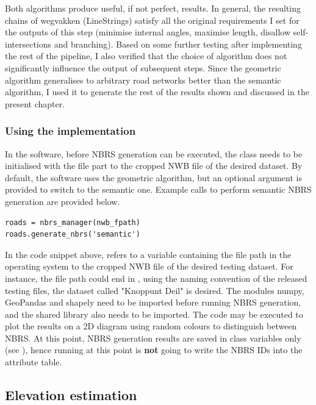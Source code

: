 Both algorithms produce useful, if not perfect, results. In general, the resulting chains of wegvakken (LineStrings) satisfy all the original requirements I set for the outputs of this step (minimise internal angles, maximise length, disallow self-intersections and branching). Based on some further testing after implementing the rest of the pipeline, I also verified that the choice of algorithm does not significantly influence the output of subsequent steps. Since the geometric algorithm generalises to arbitrary road networks better than the semantic algorithm, I used it to generate the rest of the results shown and discussed in the present chapter.

\subsubsection{Using the implementation}

In the software, before NBRS generation can be executed, the  class needs to be initialised with the file part to the cropped NWB file of the desired dataset. By default, the software uses the geometric algorithm, but an optional argument is provided to switch to the semantic one. Example calls to perform semantic NBRS generation are provided below.

\begin{lstlisting}
roads = nbrs_manager(nwb_fpath)
roads.generate_nbrs('semantic')
\end{lstlisting}

In the code snippet above,  refers to a variable containing the file path in the operating system to the cropped NWB file of the desired testing dataset. For instance, the file path could end in , using the naming convention of the released testing files, the dataset called "Knoppunt Deil" is desired. The modules numpy, GeoPandas and shapely need to be imported before running NBRS generation, and the shared library  also needs to be imported. The code  may be executed to plot the results on a 2D diagram using random colours to distinguish between NBRS. At this point, NBRS generation results are saved in class variables only (see ), hence running  at this point is \textbf{not} going to write the NBRS IDs into the attribute table.

\subsection{Elevation estimation}
\label{sub:r_elevationestimation}

